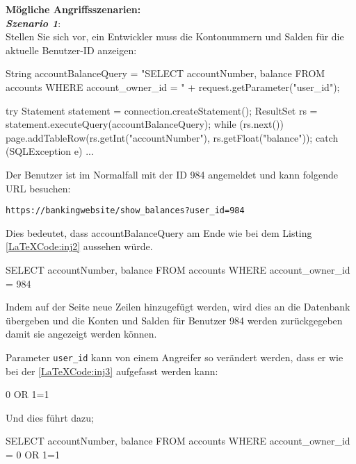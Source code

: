 \textbf{Mögliche Angriffsszenarien:}\\

\textbf{\textit{Szenario 1}}:\\
Stellen Sie sich vor, ein Entwickler muss die Kontonummern und Salden für die aktuelle Benutzer-ID anzeigen\cite{vcinj16}:\\


\begin{LaTeXCode}[caption={SQL Abfrage Beispiel 1},captionpos=b, label=LaTeXCode:inj1][numbers=none]
String accountBalanceQuery = 
"SELECT accountNumber, balance FROM accounts WHERE account_owner_id = " 
+ request.getParameter("user_id");

try
{
	Statement statement = connection.createStatement();
	ResultSet rs = statement.executeQuery(accountBalanceQuery);
	while (rs.next()) {
		page.addTableRow(rs.getInt("accountNumber"), rs.getFloat("balance"));
	}
} catch (SQLException e) { ... }
\end{LaTeXCode}

Der Benutzer ist im Normalfall mit der ID 984 angemeldet und kann folgende URL besuchen:

\texttt{https://bankingwebsite/show\_balances?user\_id=984}

Dies bedeutet, dass accountBalanceQuery am Ende wie bei dem Listing \ref{LaTeXCode:inj2} aussehen würde.

\begin{LaTeXCode}[caption={Account Balance Query},captionpos=b, label=LaTeXCode:inj2][numbers=none]
SELECT accountNumber, balance FROM accounts WHERE account_owner_id = 984
\end{LaTeXCode}

Indem auf der Seite neue Zeilen hinzugefügt werden, wird dies an die Datenbank übergeben und die Konten und Salden für Benutzer 984 werden zurückgegeben damit sie angezeigt werden können.

Parameter \texttt{user\_id} kann von einem Angreifer so verändert werden, dass er wie bei der \ref{LaTeXCode:inj3} aufgefasst werden kann:

\begin{LaTeXCode}[caption={Parameter},captionpos=b, label=LaTeXCode:inj3][numbers=none]
0 OR 1=1
\end{LaTeXCode}

Und dies führt dazu;

\begin{LaTeXCode}[caption={Account Balance Query},captionpos=b, label=LaTeXCode:inj4][numbers=none]
SELECT accountNumber, balance FROM accounts WHERE account_owner_id = 0 OR 1=1
\end{LaTeXCode}

